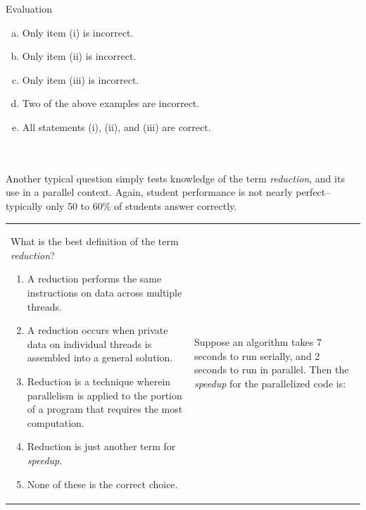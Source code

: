 \documentclass[final,t]{beamer}
\begin{document}
\begin{frame}[fragile]{}
\begin{columns}[t]
\begin{column}{.3\linewidth}
\begin{block}{Evaluation}
                \begin{enumerate}[(a)]
                    \setlength\itemindent{2cm}
                    \item Only item (i) is incorrect.
                    \item Only item (ii) is incorrect.
                    \item Only item (iii) is incorrect.
                    \item Two of the above examples are incorrect.
                    \item All statements (i), (ii), and (iii) are correct.
                \end{enumerate}
~ \\
~ \\
                Another typical question simply tests knowledge of the term
                    \emph{reduction}, and its use in a parallel context.  Again,
                    student performance is not nearly perfect--typically only 50
                    to 60\% of students answer correctly.
                \begin{tabular}{p{10in}p{10in}}
                    What is the best definition of the term \emph{reduction}?
                    \begin{enumerate}
                        \setlength\itemindent{2cm}
                        \item A reduction performs the same instructions on data
                            across multiple threads.
                        \item A reduction occurs when private data on individual
                            threads is assembled into a general solution.
                        \item Reduction is a technique wherein parallelism is
                            applied to the portion of a program that requires
                            the most computation. 
                        \item Reduction is just another term for {\em speedup}.
                        \item None of these is the correct choice.
                    \end{enumerate}
                    &  
                    Suppose an algorithm takes 7 seconds to run serially, and 2 seconds to run in parallel.  Then the {\em speedup} for the parallelized code is:
                    \begin{enumerate}
                        \setlength\itemindent{2cm}

\end{enumerate}
\end{tabular}
\end{block}
\end{column}
\end{columns}
\end{frame}
\end{document}
